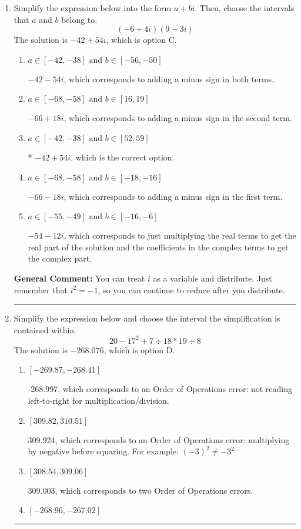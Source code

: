 \documentclass{extbook}[14pt]
\newcommand{\litem}[1]{\item #1

\rule{\textwidth}{0.4pt}}
\begin{document}
\begin{enumerate}\litem{
Simplify the expression below into the form $a+bi$. Then, choose the intervals that $a$ and $b$ belong to.
\[ (-6 + 4 i)(9 - 3 i) \]The solution is \( -42 + 54 i \), which is option C.\begin{enumerate}[label=\Alph*.]
\item \( a \in [-42, -38] \text{ and } b \in [-56, -50] \)

 $-42 - 54 i$, which corresponds to adding a minus sign in both terms.
\item \( a \in [-68, -58] \text{ and } b \in [16, 19] \)

 $-66 + 18 i$, which corresponds to adding a minus sign in the second term.
\item \( a \in [-42, -38] \text{ and } b \in [52, 59] \)

* $-42 + 54 i$, which is the correct option.
\item \( a \in [-68, -58] \text{ and } b \in [-18, -16] \)

 $-66 - 18 i$, which corresponds to adding a minus sign in the first term.
\item \( a \in [-55, -49] \text{ and } b \in [-16, -6] \)

 $-54 - 12 i$, which corresponds to just multiplying the real terms to get the real part of the solution and the coefficients in the complex terms to get the complex part.
\end{enumerate}

\textbf{General Comment:} You can treat $i$ as a variable and distribute. Just remember that $i^2=-1$, so you can continue to reduce after you distribute.
}
\litem{
Simplify the expression below and choose the interval the simplification is contained within.
\[ 20 - 17^2 + 7 \div 18 * 19 \div 8 \]The solution is \( -268.076 \), which is option D.\begin{enumerate}[label=\Alph*.]
\item \( [-269.87, -268.41] \)

 -268.997, which corresponds to an Order of Operations error: not reading left-to-right for multiplication/division.
\item \( [309.82, 310.51] \)

 309.924, which corresponds to an Order of Operations error: multiplying by negative before squaring. For example: $(-3)^2 \neq -3^2$
\item \( [308.54, 309.06] \)

 309.003, which corresponds to two Order of Operations errors.
\item \( [-268.96, -267.02] \)


\end{enumerate}}
\end{enumerate}
\end{document}
